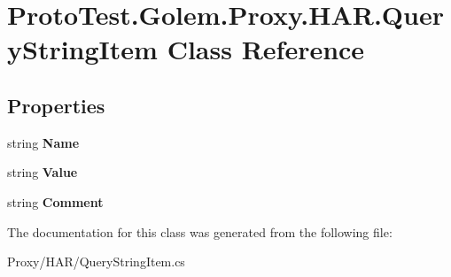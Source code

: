 \hypertarget{class_proto_test_1_1_golem_1_1_proxy_1_1_h_a_r_1_1_query_string_item}{\section{Proto\-Test.\-Golem.\-Proxy.\-H\-A\-R.\-Query\-String\-Item Class Reference}
\label{class_proto_test_1_1_golem_1_1_proxy_1_1_h_a_r_1_1_query_string_item}
}
\subsection*{Properties}
\begin{DoxyCompactItemize}
\item 
\hypertarget{class_proto_test_1_1_golem_1_1_proxy_1_1_h_a_r_1_1_query_string_item_a5892bdb15131081ac607d12ba246da99}{string {\bfseries Name}}\label{class_proto_test_1_1_golem_1_1_proxy_1_1_h_a_r_1_1_query_string_item_a5892bdb15131081ac607d12ba246da99}

\item 
\hypertarget{class_proto_test_1_1_golem_1_1_proxy_1_1_h_a_r_1_1_query_string_item_a4a56b050c11fda0b5f24f95a7a1a372c}{string {\bfseries Value}}\label{class_proto_test_1_1_golem_1_1_proxy_1_1_h_a_r_1_1_query_string_item_a4a56b050c11fda0b5f24f95a7a1a372c}

\item 
\hypertarget{class_proto_test_1_1_golem_1_1_proxy_1_1_h_a_r_1_1_query_string_item_ac7b36403494af143e76ce51fa52efc1e}{string {\bfseries Comment}}\label{class_proto_test_1_1_golem_1_1_proxy_1_1_h_a_r_1_1_query_string_item_ac7b36403494af143e76ce51fa52efc1e}

\end{DoxyCompactItemize}


The documentation for this class was generated from the following file\-:\begin{DoxyCompactItemize}
\item 
Proxy/\-H\-A\-R/Query\-String\-Item.\-cs\end{DoxyCompactItemize}
